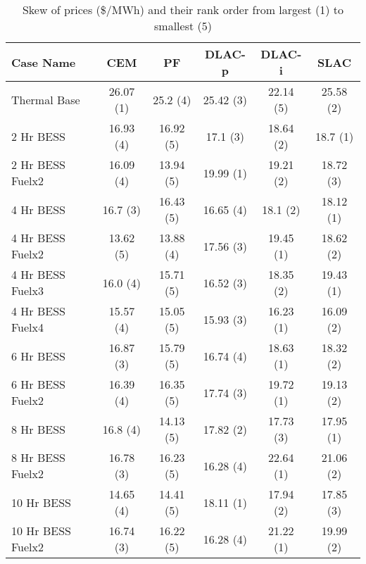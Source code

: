 \begin{table}[htp]
\centering
\begin{tabular}{lccccc}
\hline
\textbf{Case Name} & CEM & PF & DLAC-p & DLAC-i & SLAC \\
\hline
Thermal Base & 26.07 (1) & 25.2 (4) & 25.42 (3) & 22.14 (5) & 25.58 (2) \\
2 Hr BESS & 16.93 (4) & 16.92 (5) & 17.1 (3) & 18.64 (2) & 18.7 (1) \\
2 Hr BESS Fuelx2 & 16.09 (4) & 13.94 (5) & 19.99 (1) & 19.21 (2) & 18.72 (3) \\
4 Hr BESS & 16.7 (3) & 16.43 (5) & 16.65 (4) & 18.1 (2) & 18.12 (1) \\
4 Hr BESS Fuelx2 & 13.62 (5) & 13.88 (4) & 17.56 (3) & 19.45 (1) & 18.62 (2) \\
4 Hr BESS Fuelx3 & 16.0 (4) & 15.71 (5) & 16.52 (3) & 18.35 (2) & 19.43 (1) \\
4 Hr BESS Fuelx4 & 15.57 (4) & 15.05 (5) & 15.93 (3) & 16.23 (1) & 16.09 (2) \\
6 Hr BESS & 16.87 (3) & 15.79 (5) & 16.74 (4) & 18.63 (1) & 18.32 (2) \\
6 Hr BESS Fuelx2 & 16.39 (4) & 16.35 (5) & 17.74 (3) & 19.72 (1) & 19.13 (2) \\
8 Hr BESS & 16.8 (4) & 14.13 (5) & 17.82 (2) & 17.73 (3) & 17.95 (1) \\
8 Hr BESS Fuelx2 & 16.78 (3) & 16.23 (5) & 16.28 (4) & 22.64 (1) & 21.06 (2) \\
10 Hr BESS & 14.65 (4) & 14.41 (5) & 18.11 (1) & 17.94 (2) & 17.85 (3) \\
10 Hr BESS Fuelx2 & 16.74 (3) & 16.22 (5) & 16.28 (4) & 21.22 (1) & 19.99 (2) \\
\hline
\end{tabular}
\caption{Skew of prices (\$/MWh) and their rank order from largest (1) to smallest (5)}
\label{tab:std_with_ranks}
\end{table}
